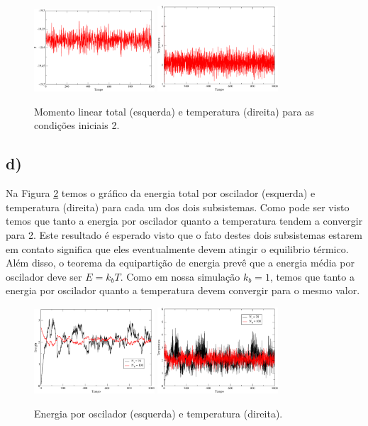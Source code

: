 \documentclass[a4wide]{report}
\begin{document}
\begin{figure}[!htb]
\centering
\includegraphics[width=0.4\textwidth]{p2.pdf}
\includegraphics[width=0.4\textwidth]{temp2.pdf}
\caption{Momento linear total (esquerda) e temperatura (direita) para as condições iniciais 2.}
\label{2c2}
\end{figure}

\subsection*{d)}

Na Figura \ref{2d1} temos o gráfico da energia total por oscilador (esquerda) e temperatura (direita) para cada um dos dois subsistemas. Como pode ser visto temos que tanto a energia por oscilador quanto a temperatura tendem a convergir para 2. Este resultado é esperado visto que o fato destes dois subsistemas estarem em contato significa que eles eventualmente devem atingir o equilibrio térmico. Além disso, o teorema da equipartição de energia prevê que a energia média por oscilador deve ser $E = k_b T$. Como em nossa simulação $k_b = 1$, temos que tanto a energia por oscilador quanto a temperatura devem convergir para o mesmo valor.

\begin{figure}[!htb]
\centering
\includegraphics[width=0.4\textwidth]{energia2d.pdf}
\includegraphics[width=0.4\textwidth]{temp2d.pdf}
\caption{Energia por oscilador (esquerda) e temperatura (direita).}
\label{2d1}
\end{figure}
\end{document}
